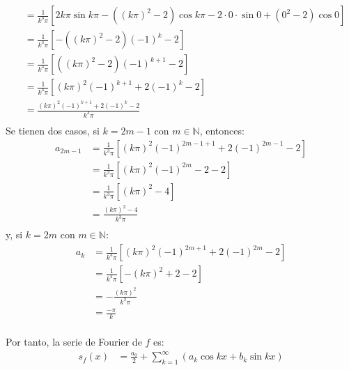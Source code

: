 \documentclass[12pt]{report}
\theoremstyle{largebreak}
\begin{document}
\begin{sol}
\begin{itemize}
\begin{equation*}
\begin{split}
                    &=\frac{1}{k^3\pi}\left[2k\pi\sin k\pi-((k\pi)^2-2)\cos k\pi-2\cdot0\cdot\sin 0+(0^2-2)\cos 0\right]\\
                    &=\frac{1}{k^3\pi}\left[-((k\pi)^2-2)(-1)^k-2\right]\\
                    &=\frac{1}{k^3\pi}\left[((k\pi)^2-2)(-1)^{k+1}-2\right]\\
                    &=\frac{1}{k^3\pi}\left[(k\pi)^2(-1)^{k+1}+2(-1)^k-2\right]\\
                    &=\frac{(k\pi)^2(-1)^{k+1}+2(-1)^k-2}{k^3\pi}\\
                \end{split}
            \end{equation*}
            Se tienen dos casos, si $k=2m-1$ con $m\in\mathbb{N}$, entonces:
            \begin{equation*}
                \begin{split}
                    a_{2m-1}&=\frac{1}{k^3\pi}\left[(k\pi)^2(-1)^{2m-1+1}+2(-1)^{2m-1}-2\right]\\
                    &=\frac{1}{k^3\pi}\left[(k\pi)^2(-1)^{2m}-2-2\right]\\
                    &=\frac{1}{k^3\pi}\left[(k\pi)^2-4\right]\\
                    &=\frac{(k\pi)^2-4}{k^3\pi}\\
                \end{split}
            \end{equation*}
            y, si $k=2m$ con $m\in\mathbb{N}$:
            \begin{equation*}
                \begin{split}
                    a_k&=\frac{1}{k^3\pi}\left[(k\pi)^2(-1)^{2m+1}+2(-1)^{2m}-2\right]\\
                    &=\frac{1}{k^3\pi}\left[-(k\pi)^2+2-2\right]\\
                    &=-\frac{(k\pi)^2}{k^3\pi}\\
                    &=\frac{-\pi}{k}\\
                \end{split}
            \end{equation*}
        \end{itemize}
        Por tanto, la serie de Fourier de $f$ es:
        \begin{equation*}
            \begin{split}
                s_f(x)&=\frac{a_0}{2}+\sum_{ k=1}^\infty\left(a_k\cos kx+b_k\sin kx\right)\\

\end{split}
\end{equation*}
\end{sol}
\end{document}
